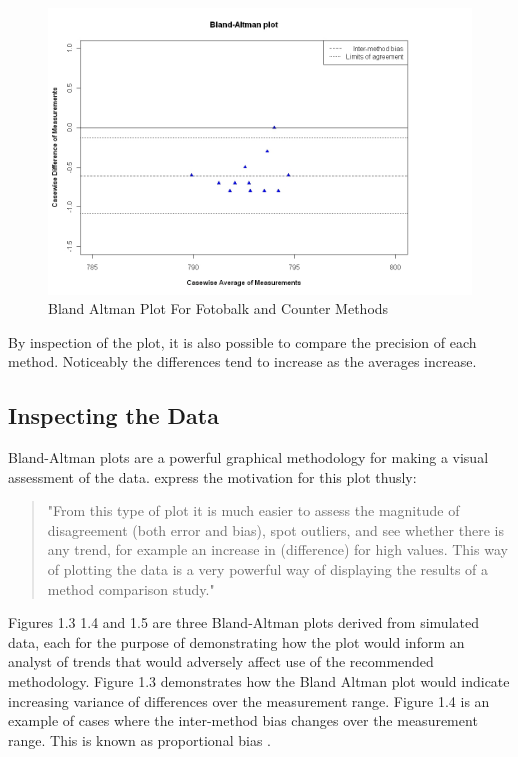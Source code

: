\documentclass[12pt, a4paper]{report}
\theoremstyle{plain}
\theoremstyle{definition}
\theoremstyle{remark}
\begin{document}
	
	\begin{figure}[h!]
		\begin{center}
			\includegraphics[width=120mm]{images/GrubbsBAplot.jpeg}
			\caption{Bland Altman Plot For Fotobalk and Counter Methods}\label{GrubbsBA}
		\end{center}
	\end{figure}
	
	\newpage
	By inspection of the plot, it is also possible to compare the precision of each method. Noticeably the differences tend to
	increase as the averages increase.
	
	\subsection{Inspecting the Data}
	Bland-Altman plots are a powerful graphical methodology for making a visual assessment of the data. \citet*{BA83} express the motivation for this plot thusly:
	\begin{quote}
		"From this type of plot it is much easier to assess the magnitude
		of disagreement (both error and bias), spot outliers, and see
		whether there is any trend, for example an increase in
		(difference) for high values. This way of plotting the data is a
		very powerful way of displaying the results of a method comparison
		study."
	\end{quote}
	
	
	Figures 1.3 1.4 and 1.5 are three Bland-Altman plots derived from
	simulated data, each for the purpose of demonstrating how the plot
	would inform an analyst of trends that would adversely affect use
	of the recommended methodology. Figure 1.3 demonstrates how the
	Bland Altman plot would indicate increasing variance of
	differences over the measurement range. Figure 1.4 is an example
	of cases where the inter-method bias changes over the measurement
	range. This is known as proportional bias \citep{ludbrook97}.
	
\end{document}
